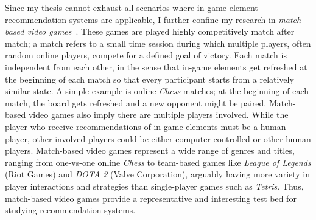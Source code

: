 

Since my thesis cannot exhaust all scenarios where in-game element recommendation systems are applicable, I further confine my research in \textit{match-based video games}~\cite{guo2012analysis}. These games are played highly competitively match after match; a match refers to a small time session during which multiple players, often random online players, compete for a defined goal of victory. Each match is independent from each other, in the sense that in-game elements get refreshed at the beginning of each match so that every participant starts from a relatively similar state. A simple example is online \textit{Chess} matches; at the beginning of each match, the board gets refreshed and a new opponent might be paired. Match-based video games also imply there are multiple players involved. While the player who receive recommendations of in-game elements must be a human player, other involved players could be either computer-controlled or other human players. Match-based video games represent a wide range of genres and titles, ranging from one-vs-one online \textit{Chess} to team-based games like \textit{League of Legends} (Riot Games) and \textit{DOTA 2} (Valve Corporation), arguably having more variety in player interactions and strategies than single-player games such as \textit{Tetris}. Thus, match-based video games provide a representative and interesting test bed for studying recommendation systems.



